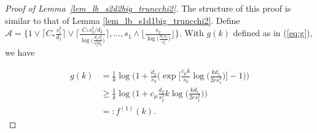 \documentclass{article}
\newcommand{\cA}{\mathcal{A}}
\newcommand{\Ct}{C_{*}}
\theoremstyle{remark}
\begin{document}
\begin{proof}[Proof of Lemma~\ref{lem_lb_s2d2big_truncchi2}]
    The structure of this proof is similar to that of Lemma \ref{lem_lb_s1d1big_truncchi2}. Define $\cA = \{ 1 \vee \lceil\Ct \frac{s_1^2}{d_1} \rceil \vee \Big\lceil \frac{\Ct s_2^2/d_2}{\log\big(\frac{d_1s_2^2}{s_1^2d_2}\big)}\Big\rceil, \dots , s_1 \wedge \lfloor\frac{s_2}{\log\big(\frac{d_1s_2}{s_1^2}\big)} \rfloor \}$. With $g(k)$ defined as in (\ref{eq:g}), we have 

    \begin{align*}
        g(k) &= \frac{1}{k}\log\Bigg(1 + \frac{d_2}{s_2}\bigg(\exp\Big[\frac{c_\mu k}{s_2}\log\big(\frac{kd_1}{2es_1^2}\big)\Big] - 1\bigg)\Bigg) \\
        &\geq \frac{1}{k}\log\Bigg(1 + c_\mu\frac{d_2}{s^2_2}k\log\Big(\frac{kd_1}{2es_1^2}\Big)\Bigg) \\
        &=: f^{(1)}(k).
    \end{align*}


\end{proof}
\end{document}
